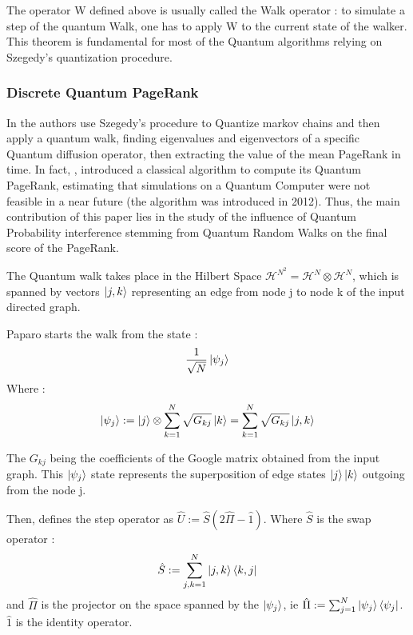 \documentclass{article}
\begin{document}
The operator W defined above is usually called the Walk operator : to simulate a step of the quantum Walk, one has to apply W to the current state of the walker. This theorem is fundamental for most of the Quantum algorithms relying on Szegedy's quantization procedure.

\subsubsection{Discrete Quantum PageRank} 
\label{subsubsection:Paparo_quantum_walk}
In \cite{paparo_martin-delgado_2012} the authors use Szegedy’s procedure \cite{szegedy} to Quantize markov chains and then apply a quantum walk, finding eigenvalues and eigenvectors of a specific Quantum diffusion operator, then extracting the value of the mean PageRank in time. In fact, \cite{paparo_martin-delgado_2012}, introduced a classical algorithm to compute its Quantum PageRank, estimating that simulations on a Quantum Computer were not feasible in a near future (the algorithm was introduced in 2012). Thus, the main contribution of this paper lies in the study of the influence of Quantum Probability interference stemming from Quantum Random Walks on the final score of the PageRank.

The Quantum walk takes place in the Hilbert Space $\mathcal{H}^{N^2} = \mathcal{H}^{N} \otimes \mathcal{H}^{N}$, which is spanned by vectors $\ket{j,k}$ representing an edge from node j to node k of the input directed graph.

Paparo \cite{paparo_martin-delgado_2012} starts the walk from the state :
\begin{equation*}
    \frac{1}{\sqrt{N}}\ket{\psi_j}
\end{equation*}
Where :
\begin{equation*}
    \ket{\psi_j} := \ket{j} \otimes \sum_{k=1}^N \sqrt{G_{kj}} \ket{k} = \sum_{k=1}^N \sqrt{G_{kj}} \ket{j,k}
\end{equation*}

The $G_{kj}$ being the coefficients of the Google matrix obtained from the input graph.
This $\ket{\psi_j}$ state represents the superposition of edge states $\ket{j} \ket{k}$ outgoing from the node j.

Then, \cite{paparo_martin-delgado_2012} defines the step operator as  $\hat{U} := \hat{S} (2 \hat{ \Pi} - \hat{{1}})$. Where $\hat{S}$ is the swap operator : 
\begin{equation*}
    \hat{S} := \sum_{j,k=1}^N \ket{j,k}\bra{k,j}
\end{equation*}
and $\hat{\Pi}$ is the projector on the space spanned by the $\ket{\psi_j}$, ie $\hat{\Pi} := \sum_{j=1}^N \ket{\psi_j}\bra{\psi_j}$. $\hat{1}$ is the identity operator.
\end{document}
